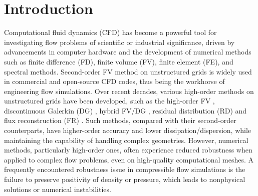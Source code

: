 

\section{Introduction}
\label{sec:intro}

Computational fluid dynamics (CFD) has become a powerful tool for investigating flow problems of scientific or industrial significance, driven by advancements in computer hardware and the development of numerical methods such as finite difference (FD), finite volume (FV), finite element (FE), and spectral methods.
Second-order FV method on unstructured grids \cite{van1979towards}
is widely used in commercial and open-source CFD codes, thus being the workhorse of engineering
flow simulations. Over recent decades, various high-order methods on unstructured grids have been developed,
such as the high-order FV \cite{ollivier1997quasi_ENO,dumbser2007quadrature_WENO,wang2017compact_VR,nishikawa2023efficient},
discontinuous Galerkin (DG) \cite{reed1973triangularDG,cockburn2001rungeDG},
hybrid FV/DG \cite{dumbser2008unified,li2022reconstructed,zhang2012class1},
residual distribution (RD)  \cite{abgrall2003construction} and
flux reconstruction (FR) \cite{huynh2007flux,vincent2011new,wang2009unifying}.
Such methods, compared with their second-order counterparts,
have higher-order accuracy and lower dissipation/dispersion,
while maintaining the capability of handling complex geometries.
However, numerical methods, particularly high-order ones, often experience reduced robustness when applied to complex flow problems, even on high-quality computational meshes.
A frequently encountered robustness issue in compressible flow simulations is the failure to
preserve positivity of density or pressure, which leads to nonphysical solutions or numerical instabilities.

